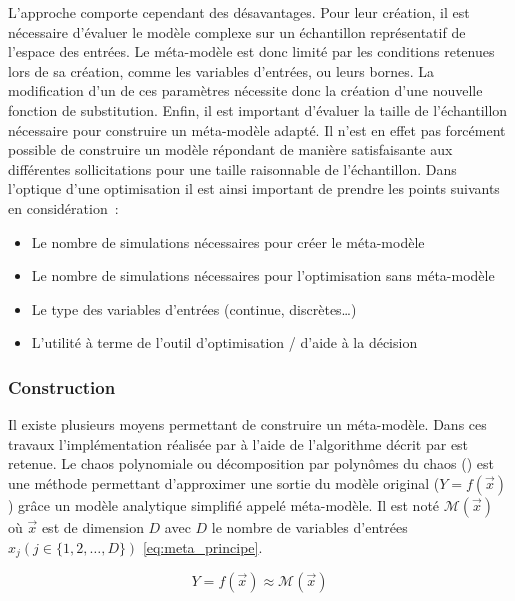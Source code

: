 L’approche comporte cependant des désavantages. Pour leur création, il est nécessaire
d’évaluer le modèle complexe sur un échantillon représentatif de l’espace des entrées.
Le méta-modèle est donc limité par les conditions retenues lors de sa création, comme
les variables d’entrées, ou leurs bornes. La modification d’un de ces paramètres nécessite
donc la création d’une nouvelle fonction de substitution.
Enfin, il est important d’évaluer la taille de l’échantillon nécessaire pour construire
un méta-modèle adapté. Il n’est en effet pas forcément possible de construire un modèle
répondant de manière satisfaisante aux différentes sollicitations pour une taille raisonnable
de l’échantillon.
Dans l’optique d’une optimisation il est ainsi important de prendre les points
suivants en considération~:
\begin{itemize}
  \item Le nombre de simulations nécessaires pour créer le méta-modèle
  \item Le nombre de simulations nécessaires pour l’optimisation sans méta-modèle
  \item Le type des variables d’entrées (continue, discrètes\dots)
  \item L’utilité à terme de l’outil d’optimisation / d’aide à la décision
\end{itemize}


\subsubsection{Construction} %
\label{ssub:construction}
Il existe plusieurs moyens permettant de construire un méta-modèle. Dans ces travaux
l’implémentation réalisée par \textcite{Merheb2013} à l’aide de l’algorithme décrit par
\textcite{Malen2009} est retenue. Le chaos polynomiale ou décomposition par polynômes du
chaos () est une méthode permettant d’approximer une sortie du modèle original
($Y = f(\vec{x})$) grâce un modèle analytique simplifié appelé méta-modèle. Il est noté
$\mathcal{M}(\vec{x})$ où $\vec{x}$ est de dimension $D$ avec $D$ le nombre de variables d’entrées
$x_{j} (j \in \{1, 2, \dotsc, D\})$ \eqref{eq:meta_principe}.

\begin{equation}\label{eq:meta_principe}
  Y = f(\vec{x}) \approx \mathcal{M}(\vec{x})
\end{equation}

